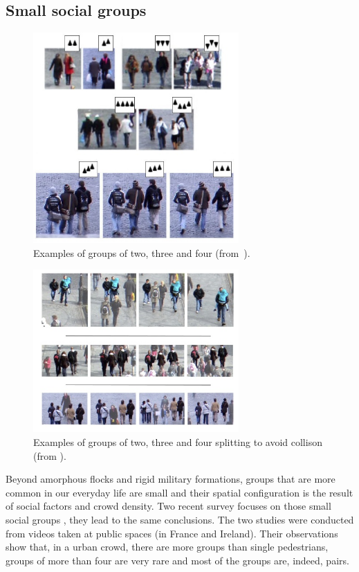 \documentclass[a4paper,titlepage]{article}
\begin{document}
\subsection{Small social groups}
\label{sec:taxonomy:small_social_groups}

\begin{figure}[h]
\centering
\includegraphics[width=0.7\textwidth]{SocialGroups.jpg}
\caption{Examples of groups of two, three and four (from~\cite{Peters:2009kx}).}
\label{fig:social_groups}
\end{figure}

\begin{figure}[h]
\centering
\includegraphics[width=0.7\textwidth]{SocialGroupsSplitting.jpg}
\caption{Examples of groups of two, three and four splitting to avoid collison (from \cite{Peters:2009kx}).}
\label{fig:social_groups_splitting}
\end{figure}

Beyond amorphous flocks and rigid military formations, groups that are more common in our everyday life are small and their spatial configuration is the result of social factors and crowd density. Two recent survey focuses on those small social groups \cite{Peters:2009kx,Moussaid:2010ib}, they lead to the same conclusions.
The two studies were conducted from videos taken at public spaces (in France and Ireland). Their observations show that, in a urban crowd, there are more groups than single pedestrians, groups of more than four are very rare and most of the groups are, indeed, pairs.
\end{document}

